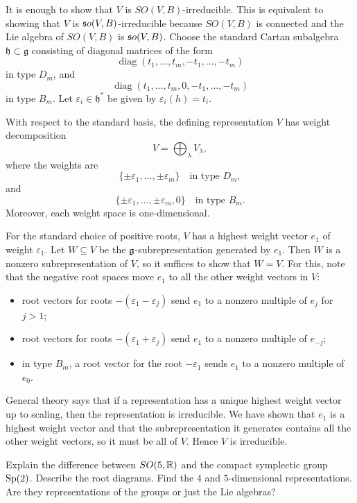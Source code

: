 \documentclass[12pt]{article}
\begin{document}
\begin{solution}
    It is enough to show that $V$ is $SO(V,B)$-irreducible. This is equivalent to showing that $V$ is $\mathfrak{s}o(V,B)$-irreducible because $SO(V,B)$ is connected and the Lie algebra of $SO(V,B)$ is $\mathfrak{s}o(V,B)$. Choose the standard Cartan subalgebra $\mathfrak h\subset \mathfrak g$ consisting of diagonal matrices of the form
    \[
        \operatorname{diag}(t_1,\dots,t_m,-t_1,\dots,-t_m)
    \]
    in type $D_m$, and
    \[
        \operatorname{diag}(t_1,\dots,t_m,0,-t_1,\dots,-t_m)
    \]
    in type $B_m$.
    Let $\varepsilon_i\in \mathfrak h^*$ be given by $\varepsilon_i(h)=t_i$.

    With respect to the standard basis, the defining representation $V$ has weight decomposition
    \[
        V=\bigoplus_{\lambda} V_\lambda,
    \]
    where the weights are
    \[
        \{\pm \varepsilon_1,\dots,\pm \varepsilon_m\}
        \quad\text{in type }D_m,
    \]
    and
    \[
        \{\pm \varepsilon_1,\dots,\pm \varepsilon_m,0\}
        \quad\text{in type }B_m.
    \]
    Moreover, each weight space is one-dimensional.

    For the standard choice of positive roots, $V$ has a highest weight vector $e_1$ of weight $\varepsilon_1$. Let $W\subseteq V$ be the $\mathfrak{g}$-subrepresentation generated by $e_1$. Then $W$ is a nonzero subrepresentation of $V$, so it suffices to show that $W=V$.
    For this, note that the negative root spaces move $e_1$ to all the other weight vectors in $V$:
    \begin{itemize}
        \item root vectors for roots $-(\varepsilon_1-\varepsilon_j)$ send $e_1$ to a nonzero multiple of $e_j$ for $j>1$;
        \item root vectors for roots $-(\varepsilon_1+\varepsilon_j)$ send $e_1$ to a nonzero multiple of $e_{-j}$;
        \item in type $B_m$, a root vector for the root $-\varepsilon_1$ sends $e_1$ to a nonzero multiple of $e_0$.
    \end{itemize}
    General theory says that if a representation has a unique highest weight vector up to scaling, then the representation is irreducible. We have shown that $e_1$ is a highest weight vector and that the subrepresentation it generates contains all the other weight vectors, so it must be all of $V$. Hence $V$ is irreducible.
\end{solution}

\begin{exercise}
    Explain the difference between $SO(5,\mathbb{R})$ and the compact symplectic group $\operatorname{Sp}(2)$. Describe the root diagrams. Find the $4$ and $5$-dimensional representations. Are they representations of the groups or just the Lie algebras?
\end{exercise}
\end{document}
